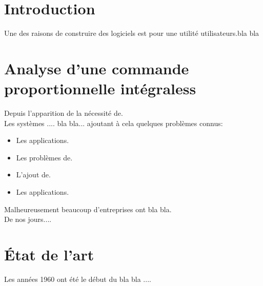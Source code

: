 \documentclass[12pt, a4paper, openany]{report}
\begin{document}
\renewcommand{\contentsname}{Sommaire}
\tableofcontents
\listoffigures
\listoftables



\chapter{Introduction}
 
  Une des raisons de construire des logiciels est pour une utilité utilisateurs.bla bla
                                                      



\chapter{ Analyse d'une commande proportionnelle intégraless}
   Depuis l’apparition de la nécessité de. \\
   
   Les systèmes .... bla bla... ajoutant à cela quelques problèmes connus:
   
    \begin{itemize}[label=$\square$]
      \item  Les applications.
      \item  Les problèmes de. 
      \item  L'ajout de.
      \item  Les applications.
  \end{itemize}
  
   Malheureusement beaucoup d'entreprises ont bla bla. \\
   
   De nos jours....
   
   



\chapter*{État de l'art}

 Les années 1960 ont été le début du bla bla .... \\
 
\end{document}
